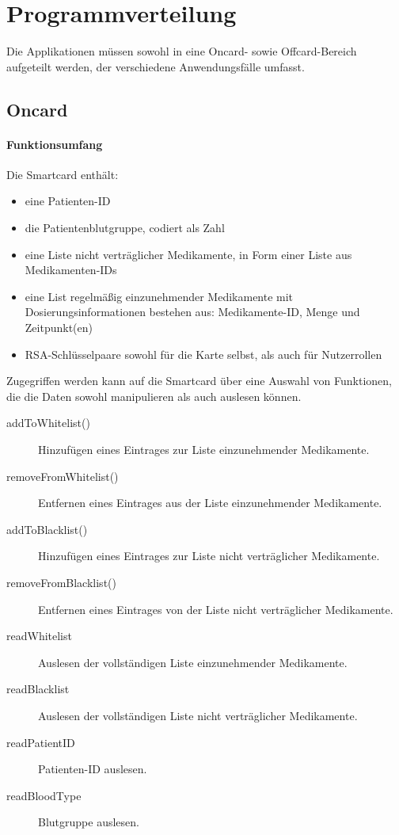 \documentclass[parskip]{scrartcl}
\begin{document}
	\section{Programmverteilung}
	Die Applikationen müssen sowohl in eine Oncard- sowie Offcard-Bereich aufgeteilt werden, der verschiedene Anwendungsfälle umfasst.

	\subsection{Oncard}
	
	\paragraph{Funktionsumfang}
	Die Smartcard enthält:
	
	\begin{itemize}
	\item eine Patienten-ID
	\item die Patientenblutgruppe, codiert als Zahl
	\item eine Liste nicht verträglicher Medikamente, in Form einer Liste aus Medikamenten-IDs
	\item eine List regelmäßig einzunehmender Medikamente mit Dosierungsinformationen bestehen aus: Medikamente-ID, Menge und Zeitpunkt(en)
	\item RSA-Schlüsselpaare sowohl für die Karte selbst, als auch für Nutzerrollen
	\end{itemize}

	Zugegriffen werden kann auf die Smartcard über eine Auswahl von Funktionen, die die Daten sowohl manipulieren als auch auslesen können.
	
	\begin{description}
	\item[addToWhitelist()] Hinzufügen eines Eintrages zur Liste einzunehmender Medikamente.
	\item[removeFromWhitelist()] Entfernen eines Eintrages aus der Liste einzunehmender Medikamente.
	\item[addToBlacklist()] Hinzufügen eines Eintrages zur Liste nicht verträglicher Medikamente.
	\item[removeFromBlacklist()] Entfernen eines Eintrages von der Liste nicht verträglicher Medikamente.
	\item[readWhitelist] Auslesen der vollständigen Liste einzunehmender Medikamente.
	\item[readBlacklist] Auslesen der vollständigen Liste nicht verträglicher Medikamente.
	\item[readPatientID] Patienten-ID auslesen.
	\item[readBloodType] Blutgruppe auslesen.
	\end{description}
	
\end{document}
